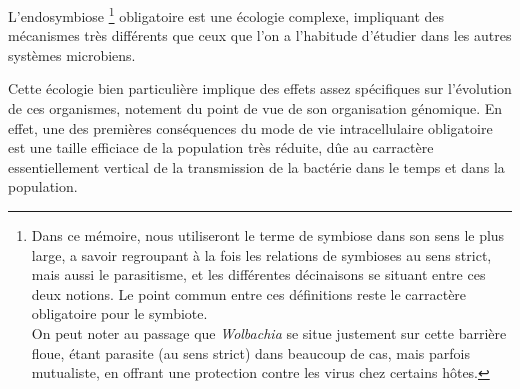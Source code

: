 


L’endosymbiose%
\footnote{Dans ce mémoire, nous utiliseront le terme de symbiose dans son sens le plus large, a savoir regroupant à la fois les relations de symbioses au sens strict, mais aussi le parasitisme, et les différentes décinaisons se situant entre ces deux notions. Le point commun entre ces définitions reste le carractère obligatoire pour le symbiote.\\
On peut noter au passage que \textit{Wolbachia} se situe justement sur cette barrière floue, étant parasite (au sens strict) dans beaucoup de cas, mais parfois mutualiste, en offrant une protection contre les virus chez certains hôtes.}
obligatoire est une écologie complexe, impliquant des mécanismes très différents que ceux que l’on a l’habitude d’étudier dans les autres systèmes microbiens.

Cette écologie bien particulière implique des effets assez spécifiques sur l'évolution de ces organismes, notement du point de vue de son organisation génomique.
En effet, une des premières conséquences du mode de vie intracellulaire obligatoire est une taille efficiace de la population très réduite, dûe au carractère essentiellement vertical de la transmission de la bactérie dans le temps et dans la population.

